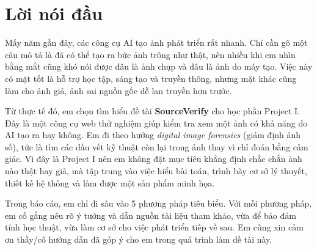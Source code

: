 \clearpage

\chapter*{Lời nói đầu}
Mấy năm gần đây, các công cụ AI tạo ảnh phát triển rất nhanh. Chỉ cần gõ một câu mô tả là đã có thể tạo ra bức ảnh trông như thật, nên nhiều khi em nhìn bằng mắt cũng khó nói được đâu là ảnh chụp và đâu là ảnh do máy tạo. Việc này có mặt tốt là hỗ trợ học tập, sáng tạo và truyền thông, nhưng mặt khác cũng làm cho ảnh giả, ảnh sai nguồn gốc dễ lan truyền hơn trước.

Từ thực tế đó, em chọn tìm hiểu đề tài \textbf{SourceVerify} cho học phần Project I. Đây là một công cụ web thử nghiệm giúp kiểm tra xem một ảnh có khả năng do AI tạo ra hay không. Em đi theo hướng \textit{digital image forensics} (giám định ảnh số), tức là tìm các dấu vết kỹ thuật còn lại trong ảnh thay vì chỉ đoán bằng cảm giác. Vì đây là Project I nên em không đặt mục tiêu khẳng định chắc chắn ảnh nào thật hay giả, mà tập trung vào việc hiểu bài toán, trình bày cơ sở lý thuyết, thiết kế hệ thống và làm được một sản phẩm minh họa.

Trong báo cáo, em chỉ đi sâu vào 5 phương pháp tiêu biểu. Với mỗi phương pháp, em cố gắng nêu rõ ý tưởng và dẫn nguồn tài liệu tham khảo, vừa để bảo đảm tính học thuật, vừa làm cơ sở cho việc phát triển tiếp về sau. Em cũng xin cảm ơn thầy/cô hướng dẫn đã góp ý cho em trong quá trình làm đề tài này.
